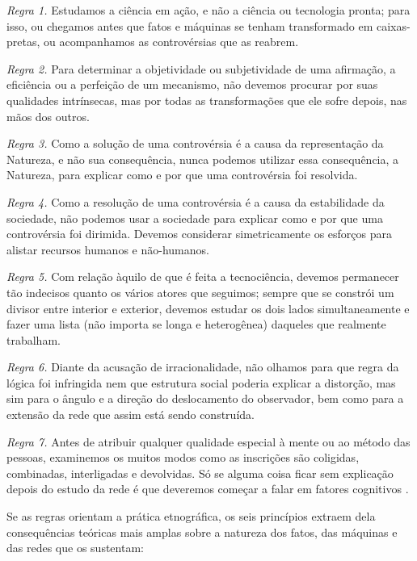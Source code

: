 \begin{citacaoabnt}
\textit{Regra 1.} Estudamos a ciência em ação, e não a ciência ou tecnologia pronta; para isso, ou chegamos antes que fatos e máquinas se tenham transformado em caixas-pretas, ou acompanhamos as controvérsias que as reabrem.

\textit{Regra 2.} Para determinar a objetividade ou subjetividade de uma afirmação, a eficiência ou a perfeição de um mecanismo, não devemos procurar por suas qualidades intrínsecas, mas por todas as transformações que ele sofre depois, nas mãos dos outros.

\textit{Regra 3.} Como a solução de uma controvérsia é a causa da representação da Natureza, e não sua consequência, nunca podemos utilizar essa consequência, a Natureza, para explicar como e por que uma controvérsia foi resolvida.

\textit{Regra 4.} Como a resolução de uma controvérsia é a causa da estabilidade da sociedade, não podemos usar a sociedade para explicar como e por que uma controvérsia foi dirimida. Devemos considerar simetricamente os esforços para alistar recursos humanos e não-humanos.

\textit{Regra 5.} Com relação àquilo de que é feita a tecnociência, devemos permanecer tão indecisos quanto os vários atores que seguimos; sempre que se constrói um divisor entre interior e exterior, devemos estudar os dois lados simultaneamente e fazer uma lista (não importa se longa e heterogênea) daqueles que realmente trabalham.

\textit{Regra 6.} Diante da acusação de irracionalidade, não olhamos para que regra da lógica foi infringida nem que estrutura social poderia explicar a distorção, mas sim para o ângulo e a direção do deslocamento do observador, bem como para a extensão da rede que assim está sendo construída.

\textit{Regra 7.} Antes de atribuir qualquer qualidade especial à mente ou ao método das pessoas, examinemos os muitos modos como as inscrições são coligidas, combinadas, interligadas e devolvidas. Só se alguma coisa ficar sem explicação depois do estudo da rede é que deveremos começar a falar em fatores cognitivos \parencite[p. 420-422]{Latour2011CienciaEmAcao}.
\end{citacaoabnt}

Se as regras orientam a prática etnográfica, os seis princípios extraem dela consequências teóricas mais amplas sobre a natureza dos fatos, das máquinas e das redes que os sustentam:


